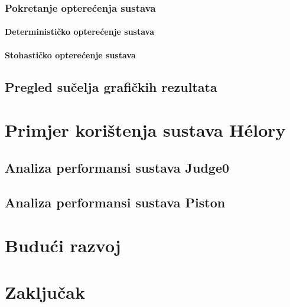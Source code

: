 \documentclass[times, utf8, diplomski]{fer}
\begin{document}
\subsection{Pokretanje opterećenja sustava}
\subsubsection{Determinističko opterećenje sustava}
\subsubsection{Stohastičko opterećenje sustava}
\section{Pregled sučelja grafičkih rezultata}

\chapter{Primjer korištenja sustava Hélory}
\section{Analiza performansi sustava Judge0}
\section{Analiza performansi sustava Piston}

\chapter{Budući razvoj}

\chapter{Zaključak}




\begin{sazetak}
\end{sazetak}

\begin{abstract}
\end{abstract}
\end{document}
